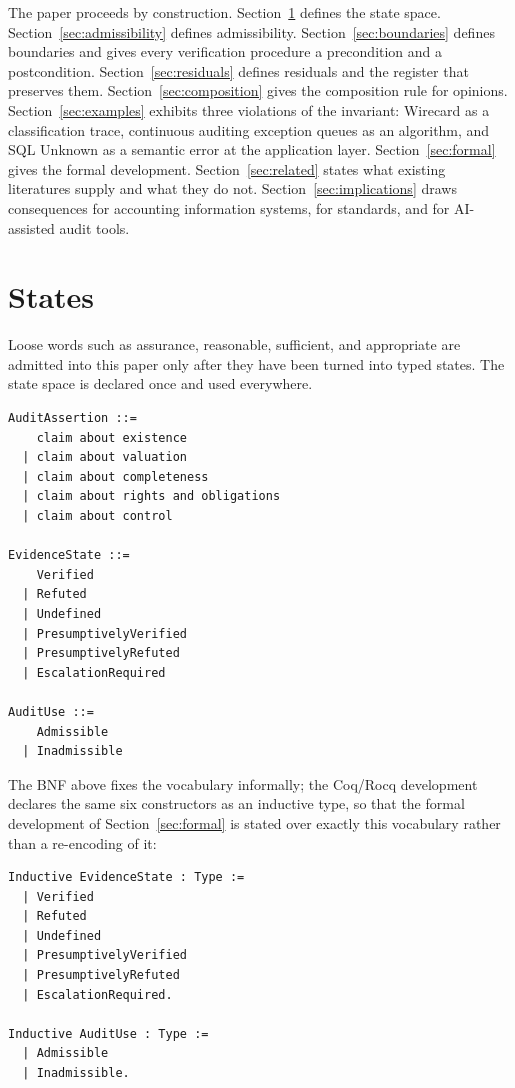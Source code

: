 \documentclass[smallcondensed,envcountsect,natbib]{svjour3}
\newcommand{\state}[1]{\textsf{#1}}
\begin{document}
The paper proceeds by construction. Section~\ref{sec:states} defines the state space. Section~\ref{sec:admissibility} defines admissibility. Section~\ref{sec:boundaries} defines boundaries and gives every verification procedure a precondition and a postcondition. Section~\ref{sec:residuals} defines residuals and the register that preserves them. Section~\ref{sec:composition} gives the composition rule for opinions. Section~\ref{sec:examples} exhibits three violations of the invariant: Wirecard as a classification trace, continuous auditing exception queues as an algorithm, and SQL \state{Unknown} as a semantic error at the application layer. Section~\ref{sec:formal} gives the formal development. Section~\ref{sec:related} states what existing literatures supply and what they do not. Section~\ref{sec:implications} draws consequences for accounting information systems, for standards, and for AI-assisted audit tools.

\section{States}
\label{sec:states}

Loose words such as assurance, reasonable, sufficient, and appropriate are admitted into this paper only after they have been turned into typed states. The state space is declared once and used everywhere.

\begin{lstlisting}
AuditAssertion ::=
    claim about existence
  | claim about valuation
  | claim about completeness
  | claim about rights and obligations
  | claim about control

EvidenceState ::=
    Verified
  | Refuted
  | Undefined
  | PresumptivelyVerified
  | PresumptivelyRefuted
  | EscalationRequired

AuditUse ::=
    Admissible
  | Inadmissible
\end{lstlisting}

The BNF above fixes the vocabulary informally; the Coq/Rocq development declares the same six constructors as an inductive type, so that the formal development of Section~\ref{sec:formal} is stated over exactly this vocabulary rather than a re-encoding of it:

\begin{lstlisting}
Inductive EvidenceState : Type :=
  | Verified
  | Refuted
  | Undefined
  | PresumptivelyVerified
  | PresumptivelyRefuted
  | EscalationRequired.

Inductive AuditUse : Type :=
  | Admissible
  | Inadmissible.
\end{lstlisting}
\end{document}
